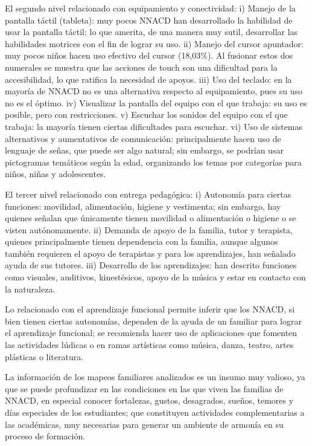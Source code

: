\documentclass[spanish]{textolivre}
\begin{document}
El segundo nivel relacionado con equipamiento y conectividad: i) Manejo de la pantalla táctil (tableta): muy pocos NNACD han desarrollado la habilidad de usar la pantalla táctil; lo que amerita, de una manera muy sutil, desarrollar las habilidades motrices con el fin de lograr su uso. ii) Manejo del cursor apuntador: muy pocos niños hacen uso efectivo del cursor (18,03\%). Al fusionar estos dos numerales se muestra que las acciones de touch son una dificultad para la accesibilidad, lo que ratifica la necesidad de apoyos. iii) Uso del teclado: en la mayoría de NNACD no es una alternativa respecto al equipamiento, pues su uso no es el óptimo. iv) Visualizar la pantalla del equipo con el que trabaja: su uso es posible, pero con restricciones. v) Escuchar los sonidos del equipo con el que trabaja: la mayoría tienen ciertas dificultades para escuchar. vi) Uso de sistemas alternativos y aumentativos de comunicación: principalmente hacen uso de lenguaje de señas, que puede ser algo natural; sin embargo, se podrían usar pictogramas temáticos según la edad, organizando los temas por categorías para niños, niñas y adolescentes.

El tercer nivel relacionado con entrega pedagógica: i) Autonomía para ciertas funciones: movilidad, alimentación, higiene y vestimenta; sin embargo, hay quienes señalan que únicamente tienen movilidad o alimentación o higiene o se visten autónomamente. ii) Demanda de apoyo de la familia, tutor y terapista, quienes principalmente tienen dependencia con la familia, aunque algunos también requieren el apoyo de terapistas y para los aprendizajes, han señalado ayuda de sus tutores. iii) Desarrollo de los aprendizajes: han descrito funciones como visuales, auditivos, kinestésicos, apoyo de la música y estar en contacto con la naturaleza.

Lo relacionado con el aprendizaje funcional permite inferir que los NNACD, si bien tienen ciertas autonomías, dependen de la ayuda de un familiar para lograr el aprendizaje funcional; se recomienda hacer uso de aplicaciones que fomenten las actividades lúdicas o en ramas artísticas como música, danza, teatro, artes plásticas o literatura.

La información de los mapeos familiares analizados es un insumo muy valioso, ya que se puede profundizar en las condiciones en las que viven las familias de NNACD, en especial conocer fortalezas, gustos, desagrados, sueños, temores y días especiales de los estudiantes; que constituyen actividades complementarias a las académicas, muy necesarias para generar un ambiente de armonía en su proceso de formación.
\end{document}
